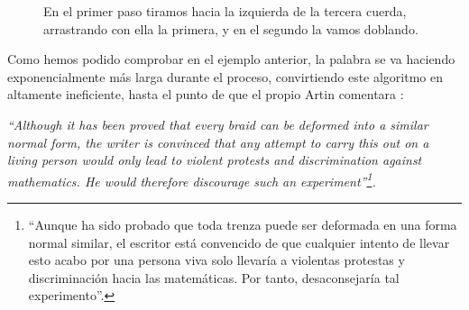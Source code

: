 \documentclass[TFG.tex]{subfiles}
\begin{document}
\begin{ej}
\begin{figure}[h!]
\quad
{}
\caption{En el primer paso tiramos hacia la izquierda de la tercera cuerda, arrastrando con ella la primera, y en el segundo la vamos doblando.}\label{peinado}
\end{figure}

\end{ej}

Como hemos podido comprobar en el ejemplo anterior, la palabra se va haciendo exponencialmente más larga durante el proceso, convirtiendo este algoritmo en altamente ineficiente, hasta el punto de que el propio Artin comentara \cite{Artin}:

\emph{``Although it has been proved that every braid can be deformed into a similar normal form, the writer is
convinced that any attempt to carry this out on a living person would only lead to violent protests and
discrimination against mathematics. He would therefore discourage such an experiment''\footnote{``Aunque ha sido probado que toda trenza puede ser deformada en una forma normal similar, el escritor está convencido de que cualquier intento de llevar esto acabo por una persona viva solo llevaría a violentas protestas y discriminación hacia las matemáticas. Por tanto, desaconsejaría tal experimento''.}.}
\end{document}
